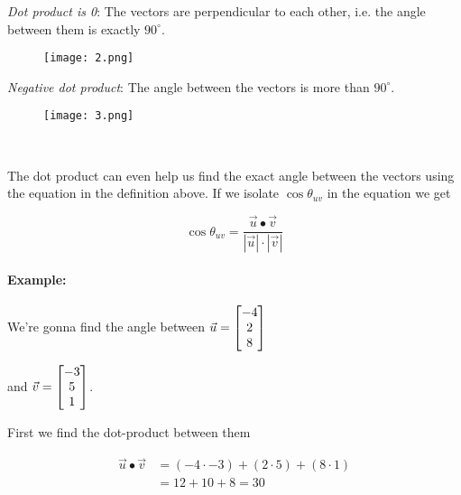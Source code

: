 \documentclass{article}
\begin{document}
\begin{minipage}{0.45\textwidth}
\begin{flushleft}
\textit{Dot product is 0}: The vectors are perpendicular to each other, i.e. the angle between them is exactly $90^\circ$. 
\end{flushleft}
\end{minipage} \hfill
\begin{minipage}{0.45\textwidth}
\begin{figure}[H]
\texttt{[image: 2.png]}
\end{figure}
\end{minipage}


\begin{minipage}{0.45\textwidth}
\begin{flushleft}
\textit{Negative dot product}: The angle between the vectors is more than $90^\circ$.  
\end{flushleft}
\end{minipage} \hfill
\begin{minipage}{0.45\textwidth}
\begin{figure}[H]
\texttt{[image: 3.png]}
\end{figure}
\end{minipage}

\

The dot product can even help us find the exact angle between the vectors using the equation in the definition above. If we isolate $\cos \theta_{uv}$ in the equation we get 

\begin{equation} \label{eq:angleDot}
\cos\theta_{uv}=\frac{\vec{u}\bullet\vec{v}}{|\vec{u}|\cdot|\vec{v}|}
\end{equation}

\paragraph{Example:} 

We're gonna find the angle between $\vec{u} = \left[\begin{matrix}-4 \\ 2 \\ 8\end{matrix}\right]$

and $\vec{v} = \left[\begin{matrix}-3 \\ 5 \\ 1\end{matrix}\right]$.

First we find the dot-product between them

\begin{align*}
\vec{u}\bullet\vec{v} &= (-4\cdot -3)+(2\cdot 5)+(8\cdot 1)\\
&= 12+10+8=30
\end{align*}
\end{document}
